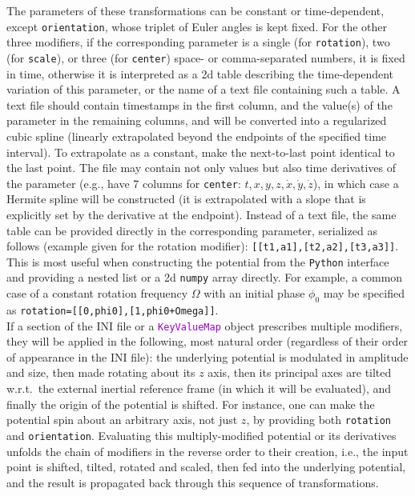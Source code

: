 \documentclass[12pt]{article}
\newcommand{\Python}{\texttt{Python}\xspace}
\newcommand{\ttt}[1]{\textcolor{darkviolet}{\texttt{#1}}}
\newcommand{\ppp}[1]{\textcolor{darkolive} {\texttt{#1}}}
\begin{document}
\begin{itemize}
The parameters of these transformations can be constant or time-dependent, except \ppp{orientation}, whose triplet of Euler angles is kept fixed. For the other three modifiers, if the corresponding parameter is a single (for \ppp{rotation}), two (for \ppp{scale}), or three (for \ppp{center}) space- or comma-separated numbers, it is fixed in time, otherwise it is interpreted as a 2d table describing the time-dependent variation of this parameter, or the name of a text file containing such a table. A text file should contain timestamps in the first column, and the value(s) of the parameter in the remaining columns, and will be converted into a regularized cubic spline (linearly extrapolated beyond the endpoints of the specified time interval). To extrapolate as a constant, make the next-to-last point identical to the last point. The file may contain not only values but also time derivatives of the parameter (e.g., have 7 columns for \ppp{center}: $t, x, y, z, \dot x, \dot y, \dot z$), in which case a Hermite spline will be constructed (it is extrapolated with a slope that is explicitly set by the derivative at the endpoint). Instead of a text file, the same table can be provided directly in the corresponding parameter, serialized as follows (example given for the rotation modifier): \texttt{[[t1,a1],[t2,a2],[t3,a3]]}. This is most useful when constructing the potential from the \Python interface and providing a nested list or a 2d \texttt{numpy} array directly. For example, a common case of a constant rotation frequency $\Omega$ with an initial phase $\phi_0$ may be specified as \ppp{rotation}\texttt{=[[0,phi0],[1,phi0+Omega]]}.\\
%
If a section of the INI file or a \ttt{KeyValueMap} object prescribes multiple modifiers, they will be applied in the following, most natural order (regardless of their order of appearance in the INI file): the underlying potential is modulated in amplitude and size, then made rotating about its $z$ axis, then its principal axes are tilted w.r.t.\ the external inertial reference frame (in which it will be evaluated), and finally the origin of the potential is shifted. For instance, one can make the potential spin about an arbitrary axis, not just $z$, by providing both \ppp{rotation} and \ppp{orientation}. Evaluating this multiply-modified potential or its derivatives unfolds the chain of modifiers in the reverse order to their creation, i.e., the input point is shifted, tilted, rotated and scaled, then fed into the underlying potential, and the result is propagated back through this sequence of transformations.\\

\end{itemize}
\end{document}
